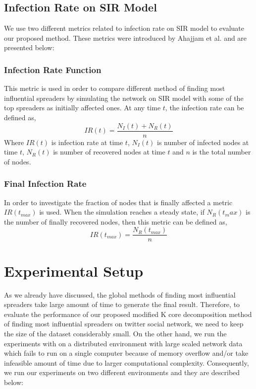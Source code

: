 \documentclass[sigconf]{acmart}
\begin{document}

\subsection{Infection Rate on SIR Model}
We use two different metrics related to infection rate on SIR model to evaluate our proposed method. These metrics were introduced by Ahajjam et al. \cite{ahajjam2018identification} and are presented below:

\subsubsection{Infection Rate Function}
This metric is used in order to compare different method of finding most influential spreaders by simulating the network on SIR model with some of the top spreaders as initially affected ones. At any time $t$, the infection rate can be defined as,
\begin{equation}
IR(t) = \dfrac{N_I(t)+N_R(t)}{n}
\label{infection rate eq}
\end{equation}
Where $IR(t)$ is infection rate at time $t$, $N_I(t)$ is number of infected nodes at time $t$, $N_R(t)$ is number of recovered nodes at time $t$ and $n$ is the total number of nodes.
 
\subsubsection{Final Infection Rate}
In order to investigate the fraction of nodes that is finally affected a metric $IR(t_{max})$ is used. When the simulation reaches a steady state, if $N_R(t_max)$ is the number of finally recovered nodes, then this metric can be defined as,
\begin{equation}
IR(t_{max}) = \dfrac{N_R(t_{max})}{n}
\label{infection rate eq}
\end{equation}





\section{Experimental Setup}
As we already have discussed, the global methods of finding most influential spreaders take large amount of time to generate the final result. Therefore, to evaluate the performance of our proposed modified K core decomposition method of finding most influential spreaders on twitter social network, we need to keep the size of the dataset considerably small. On the other hand, we run the experiments with on a distributed environment with large scaled network data which fails to run on a single computer because of memory overflow and/or take infeasible amount of time due to larger computational complexity. Consequently, we run our experiments on two different environments and they are described below:
\end{document}
